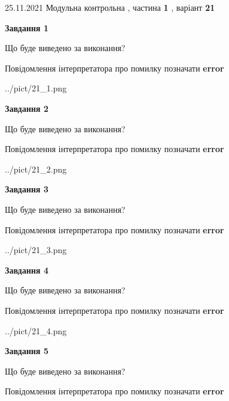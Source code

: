 \documentclass[10pt, ukrainian]{article}
\begin{document}
{25.11.2021 Модульна контрольна , частина \textbf { 1 }, варіант  \No \textbf { 21 }\par}
{
\begin {large}

{\begin {center}\textbf{Завдання 1}\end {center}}\par
Що буде виведено за виконання? \par
Повідомлення інтерпретатора про помилку позначати \textbf{error}

\begin{center}
	{../pict/21_1.png}
\end{center}
\newpage

{\begin {center}\textbf{Завдання 2}\end {center}}\par
Що буде виведено за виконання? \par
Повідомлення інтерпретатора про помилку позначати \textbf{error}

\begin{center}
	{../pict/21_2.png}
\end{center}
\newpage

{\begin {center}\textbf{Завдання 3}\end {center}}\par
Що буде виведено за виконання? \par
Повідомлення інтерпретатора про помилку позначати \textbf{error}

\begin{center}
	{../pict/21_3.png}
\end{center}
\newpage

{\begin {center}\textbf{Завдання 4}\end {center}}\par
Що буде виведено за виконання? \par
Повідомлення інтерпретатора про помилку позначати \textbf{error}

\begin{center}
	{../pict/21_4.png}
\end{center}
\newpage

{\begin {center}\textbf{Завдання 5}\end {center}}\par
Що буде виведено за виконання? \par
Повідомлення інтерпретатора про помилку позначати \textbf{error}


\end{large}}
\end{document}
